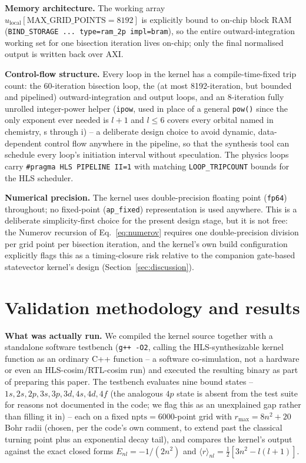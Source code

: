 \documentclass[pdflatex,sn-mathphys,Numbered]{sn-jnl}
\begin{document}
\textbf{Memory architecture.} The working array $u_{\text{local}}[\text{MAX\_GRID\_POINTS}=8192]$ is explicitly bound to on-chip block RAM (\texttt{BIND\_STORAGE ... type=ram\_2p impl=bram}), so the entire outward-integration working set for one bisection iteration lives on-chip; only the final normalised output is written back over AXI.

\textbf{Control-flow structure.} Every loop in the kernel has a compile-time-fixed trip count: the 60-iteration bisection loop, the (at most 8192-iteration, but bounded and pipelined) outward-integration and output loops, and an 8-iteration fully unrolled integer-power helper (\texttt{ipow}, used in place of a general \texttt{pow()} since the only exponent ever needed is $l+1$ and $l\le6$ covers every orbital named in chemistry, s through i) -- a deliberate design choice to avoid dynamic, data-dependent control flow anywhere in the pipeline, so that the synthesis tool can schedule every loop's initiation interval without speculation. The physics loops carry \texttt{\#pragma HLS PIPELINE II=1} with matching \texttt{LOOP\_TRIPCOUNT} bounds for the HLS scheduler.

\textbf{Numerical precision.} The kernel uses double-precision floating point (\texttt{fp64}) throughout; no fixed-point (\texttt{ap\_fixed}) representation is used anywhere. This is a deliberate simplicity-first choice for the present design stage, but it is not free: the Numerov recursion of Eq.~\eqref{eq:numerov} requires one double-precision division per grid point per bisection iteration, and the kernel's own build configuration explicitly flags this as a timing-closure risk relative to the companion gate-based statevector kernel's design (Section~\ref{sec:discussion}).

\section{Validation methodology and results}\label{sec:results}

\textbf{What was actually run.} We compiled the kernel source together with a standalone software testbench (\texttt{g++ -O2}, calling the HLS-synthesizable kernel function as an ordinary C++ function -- a software co-simulation, not a hardware or even an HLS-cosim/RTL-cosim run) and executed the resulting binary as part of preparing this paper. The testbench evaluates nine bound states -- $1s,2s,2p,3s,3p,3d,4s,4d,4f$ (the analogous $4p$ state is absent from the test suite for reasons not documented in the code; we flag this as an unexplained gap rather than filling it in) -- each on a fixed $\text{npts}=6000$-point grid with $r_{\max}=8n^2+20$ Bohr radii (chosen, per the code's own comment, to extend past the classical turning point plus an exponential decay tail), and compares the kernel's output against the exact closed forms $E_{nl}=-1/(2n^2)$ and $\langle r\rangle_{nl}=\tfrac12[3n^2-l(l+1)]$.
\end{document}
